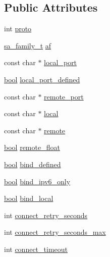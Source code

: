 \subsection*{Public Attributes}
\begin{DoxyCompactItemize}
\item 
int \hyperlink{structconnection__entry_abadee88250492bc36663259ebd1a7de7}{proto}
\item 
\hyperlink{syshead_8h_a27a82860cef19f4a53f68516e7b2ee0e}{sa\+\_\+family\+\_\+t} \hyperlink{structconnection__entry_ac49b7ba49fbc7efd0d77535d1c66a7d9}{af}
\item 
const char $\ast$ \hyperlink{structconnection__entry_aecded3865f978a060cb1539fbd394032}{local\+\_\+port}
\item 
\hyperlink{automatic_8c_abb452686968e48b67397da5f97445f5b}{bool} \hyperlink{structconnection__entry_acb69943d9faa251f2dfc213d86bf3992}{local\+\_\+port\+\_\+defined}
\item 
const char $\ast$ \hyperlink{structconnection__entry_aa399cea883d3a239190c049c004ad793}{remote\+\_\+port}
\item 
const char $\ast$ \hyperlink{structconnection__entry_af86e741661abeac7edfdb5258ec4fa5f}{local}
\item 
const char $\ast$ \hyperlink{structconnection__entry_a474c4038934a015bdcb5b038b98b35d1}{remote}
\item 
\hyperlink{automatic_8c_abb452686968e48b67397da5f97445f5b}{bool} \hyperlink{structconnection__entry_a909bc65df6db4a88c211558e3b1565f4}{remote\+\_\+float}
\item 
\hyperlink{automatic_8c_abb452686968e48b67397da5f97445f5b}{bool} \hyperlink{structconnection__entry_adb3fcab845dbc50c3190c3d1b2b97037}{bind\+\_\+defined}
\item 
\hyperlink{automatic_8c_abb452686968e48b67397da5f97445f5b}{bool} \hyperlink{structconnection__entry_a8ec3ea69d71db89eb5ecd7b4b5ce3f99}{bind\+\_\+ipv6\+\_\+only}
\item 
\hyperlink{automatic_8c_abb452686968e48b67397da5f97445f5b}{bool} \hyperlink{structconnection__entry_a237f0476d7d283fa334b6250559f11d5}{bind\+\_\+local}
\item 
int \hyperlink{structconnection__entry_a016bad39481a03a9b824e64cf8a41a23}{connect\+\_\+retry\+\_\+seconds}
\item 
int \hyperlink{structconnection__entry_a1e80ffa27efcd36772df7618004f2ddc}{connect\+\_\+retry\+\_\+seconds\+\_\+max}
\item 
int \hyperlink{structconnection__entry_a51429ed22fd30ac08ed94d0df42f46e2}{connect\+\_\+timeout}

\end{DoxyCompactItemize}
